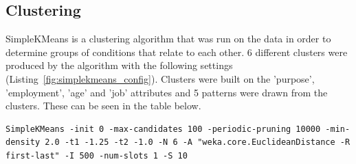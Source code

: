 \documentclass[12pt]{article}
\begin{document}
\subsection{Clustering}
SimpleKMeans is a clustering algorithm that was run on the data in order to determine groups of conditions that relate to each other. 6 different clusters were produced by the algorithm with the following settings (Listing~\ref{fig:simplekmeans_config}). Clusters were built on the 'purpose', 'employment', 'age' and 'job' attributes and 5 patterns were drawn from the clusters. These can be seen in the table below.

\begin{lstlisting}[caption="SimpleKMeans configuration"\label{fig:simplekmeans_config}]
SimpleKMeans -init 0 -max-candidates 100 -periodic-pruning 10000 -min-density 2.0 -t1 -1.25 -t2 -1.0 -N 6 -A "weka.core.EuclideanDistance -R first-last" -I 500 -num-slots 1 -S 10
\end{lstlisting}
\end{document}
